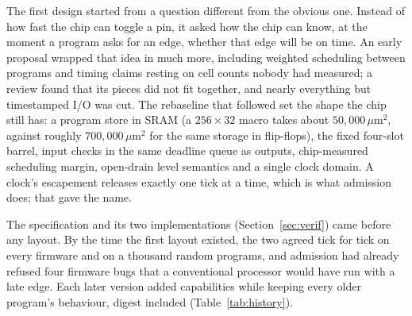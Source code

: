 \documentclass[conference,letterpaper]{IEEEtran}
\begin{document}
The first design started from a question different from the obvious one. Instead of how
fast the chip can toggle a pin, it asked how the chip can know, at the moment a program
asks for an edge, whether that edge will be on time. An early proposal wrapped that idea
in much more, including weighted scheduling between programs and timing claims resting
on cell counts nobody had measured; a review found that its pieces did not fit together,
and nearly everything but timestamped I/O was cut. The rebaseline that followed set the
shape the chip still has: a program store in SRAM (a $256\times32$ macro takes about
$50{,}000\,\mu$m$^2$, against roughly $700{,}000\,\mu$m$^2$ for the same storage in
flip-flops), the fixed four-slot barrel, input checks in the same deadline queue as
outputs, chip-measured scheduling margin, open-drain level semantics and a single clock
domain. A clock's escapement releases exactly one tick at a time, which is what
admission does; that gave the name.

The specification and its two implementations (Section~\ref{sec:verif}) came before any
layout. By the time the first layout existed, the two
agreed tick for tick on every firmware and on a thousand random programs, and admission
had already refused four firmware bugs that a conventional processor would have run with
a late edge. Each later version added capabilities while keeping every older program's
behaviour, digest included (Table~\ref{tab:history}).
\end{document}
